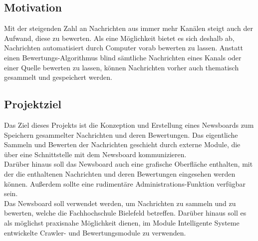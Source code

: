 \subsection{Motivation}
Mit der steigenden Zahl an Nachrichten aus immer mehr Kanälen steigt auch der Aufwand,
diese zu bewerten. Als eine Möglichkeit bietet es sich deshalb ab,
Nachrichten automatisiert durch Computer vorab bewerten zu lassen.
Anstatt einen Bewertungs-Algorithmus blind sämtliche Nachrichten eines Kanals
oder einer Quelle bewerten zu lassen, können Nachrichten vorher auch thematisch gesammelt
und gespeichert werden.

\subsection{Projektziel}
Das Ziel dieses Projekts ist die Konzeption und Erstellung eines Newsboards zum Speichern
gesammelter Nachrichten und deren Bewertungen. Das eigentliche Sammeln
und Bewerten der Nachrichten geschieht durch externe Module,
die über eine Schnittstelle mit dem Newsboard kommunizieren. \\

Darüber hinaus soll das Newsboard auch eine grafische Oberfläche enthalten,
mit der die enthaltenen Nachrichten und deren Bewertungen eingesehen werden können.
Außerdem sollte eine rudimentäre Administrations-Funktion verfügbar sein. \\

Das Newsboard soll verwendet werden, um Nachrichten zu sammeln und zu bewerten,
welche die Fachhochschule Bielefeld betreffen. Darüber hinaus soll es
als möglichst praxisnahe Möglichkeit dienen, im Module Intelligente Systeme entwickelte
Crawler- und Bewertungsmodule zu verwenden. \\
